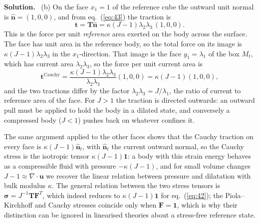 \documentclass[a4paper,12pt]{paper}
\newenvironment{solution}{\par\noindent\textbf{Solution.}\ }{\par\medskip}
\begin{document}
\begin{solution}
(b) On the face $x_{1}=1$ of the reference cube the outward unit normal is
$\hat{\mathbf{n}}=(1,0,0)$, and from eq.~(\ref{eq:43}) the traction is
\begin{equation}
\mathbf{t}=\mathbf{T}\hat{\mathbf{n}}=\kappa(J-1)\lambda_{2}\lambda_{3}\,(1,0,0).
\label{eq:44}
\end{equation}
This is the force per unit \emph{reference} area exerted on the body across the surface. The
face has unit area in the reference body, so the total force on its image is
$\kappa(J-1)\lambda_{2}\lambda_{3}$ in the $x_{1}$-direction. That image is the face
$y_{1}=\lambda_{1}$ of the box $M_{t}$, which has current area $\lambda_{2}\lambda_{3}$, so
the force per unit current area is
\begin{equation}
\mathbf{t}^{\mathrm{Cauchy}}=\frac{\kappa(J-1)\lambda_{2}\lambda_{3}}{\lambda_{2}\lambda_{3}}(1,0,0)=\kappa(J-1)(1,0,0),
\label{eq:45}
\end{equation}
and the two tractions differ by the factor $\lambda_{2}\lambda_{3}=J/\lambda_{1}$, the ratio
of current to reference area of the face. For $J>1$ the traction is directed outwards: an
outward pull must be applied to hold the body in a dilated state, and conversely a compressed
body ($J<1$) pushes back on whatever confines it.

The same argument applied to the other faces shows that the Cauchy traction on every face
is $\kappa(J-1)\hat{\mathbf{n}}_{t}$, with $\hat{\mathbf{n}}_{t}$ the current outward normal,
so the Cauchy stress is the isotropic tensor $\kappa(J-1)\mathbf{1}$: a body with this strain
energy behaves as a compressible fluid with pressure $-\kappa(J-1)$, and for small volume
changes $J-1\approx\nabla\cdot\mathbf{u}$ we recover the linear relation between pressure and
dilatation with bulk modulus $\kappa$. The general relation between the two stress tensors
is $\bm{\sigma}=J^{-1}\mathbf{T}\mathbf{F}^{T}$, which indeed reduces to $\kappa(J-1)\mathbf{1}$
for eq.~(\ref{eq:42}); the Piola--Kirchhoff and Cauchy stresses coincide only when
$\mathbf{F}=\mathbf{1}$, which is why their distinction can be ignored in linearised theories
about a stress-free reference state.
\end{solution}
\end{document}
